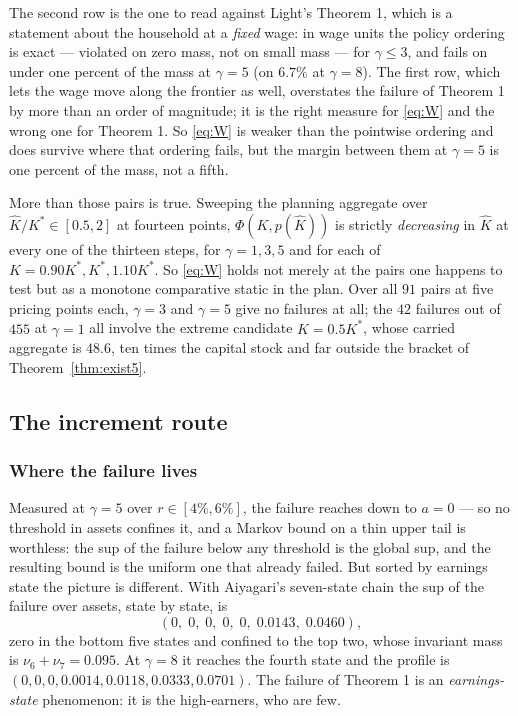 The second row is the one to read against Light's Theorem 1, which is a statement about the
household at a \emph{fixed} wage: in wage units the policy ordering is exact --- violated on zero
mass, not on small mass --- for $\gamma\le3$, and fails on under one percent of the mass at
$\gamma=5$ (on $6.7\%$ at $\gamma=8$). The first row, which lets the wage move along the frontier as
well, overstates the failure of Theorem 1 by more than an order of magnitude; it is the right
measure for \eqref{eq:W} and the wrong one for Theorem 1. So \eqref{eq:W} is weaker than the
pointwise ordering and does survive where that ordering fails, but the margin between them at
$\gamma=5$ is one percent of the mass, not a fifth.

More than those pairs is true. Sweeping the planning aggregate over $\hat K/K^*\in[0.5,2]$ at
fourteen points, $\Phi(K,p(\hat K))$ is strictly \emph{decreasing} in $\hat K$ at every one of the
thirteen steps, for $\gamma=1,3,5$ and for each of $K=0.90K^*,K^*,1.10K^*$. So \eqref{eq:W} holds
not merely at the pairs one happens to test but as a monotone comparative static in the plan. Over
all $91$ pairs at five pricing points each, $\gamma=3$ and $\gamma=5$ give no failures at all; the
$42$ failures out of $455$ at $\gamma=1$ all involve the extreme candidate $\hat K=0.5K^*$, whose
carried aggregate is $48.6$, ten times the capital stock and far outside the bracket of
Theorem~\ref{thm:exist5}.


\subsection*{The increment route}

\subsubsection*{Where the failure lives}

Measured at $\gamma=5$ over $r\in[4\%,6\%]$, the failure reaches down to $a=0$ --- so no threshold in
assets confines it, and a Markov bound on a thin upper tail is worthless: the sup of the failure
below any threshold is the global sup, and the resulting bound is the uniform one that already
failed. But sorted by earnings state the picture is different. With Aiyagari's seven-state chain the
sup of the failure over assets, state by state, is
\[
  (0,\;0,\;0,\;0,\;0,\;0.0143,\;0.0460),
\]
zero in the bottom five states and confined to the top two, whose invariant mass is
$\nu_6+\nu_7=0.095$. At $\gamma=8$ it reaches the fourth state and the profile is
$(0,0,0,0.0014,0.0118,0.0333,0.0701)$. The failure of Theorem 1 is an \emph{earnings-state}
phenomenon: it is the high-earners, who are few.

